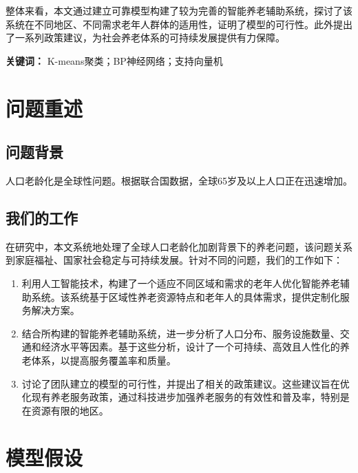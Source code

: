 \documentclass[a4paper]{article}
\begin{document}
整体来看，本文通过建立可靠模型构建了较为完善的智能养老辅助系统，探讨了该系统在不同地区、不同需求老年人群体的适用性，证明了模型的可行性。此外提出了一系列政策建议，为社会养老体系的可持续发展提供有力保障。

\vspace{0.3cm}

\noindent\textbf{关键词：} K-means聚类；BP神经网络；支持向量机

\newpage


\section{问题重述}

\subsection{问题背景}

人口老龄化是全球性问题。根据联合国数据，全球65岁及以上人口正在迅速增加。

\subsection{我们的工作}

在研究中，本文系统地处理了全球人口老龄化加剧背景下的养老问题，该问题关系到家庭福祉、国家社会稳定与可持续发展。针对不同的问题，我们的工作如下：

\begin{enumerate}
    \item 利用人工智能技术，构建了一个适应不同区域和需求的老年人优化智能养老辅助系统。该系统基于区域性养老资源特点和老年人的具体需求，提供定制化服务解决方案。
    
    \item 结合所构建的智能养老辅助系统，进一步分析了人口分布、服务设施数量、交通和经济水平等因素。基于这些分析，设计了一个可持续、高效且人性化的养老体系，以提高服务覆盖率和质量。
    
    \item 讨论了团队建立的模型的可行性，并提出了相关的政策建议。这些建议旨在优化现有养老服务政策，通过科技进步加强养老服务的有效性和普及率，特别是在资源有限的地区。
\end{enumerate}

\section{模型假设}
\end{document}
